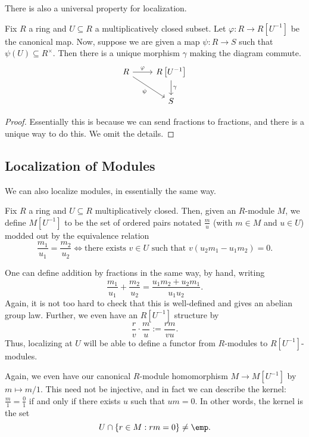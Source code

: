 There is also a universal property for localization.
\begin{proposition}
	Fix $R$ a ring and $U\subseteq R$ a multiplicatively closed subset. Let $\varphi:R\to R\left[U^{-1}\right]$ be the canonical map. Now, suppose we are given a map $\psi:R\to S$ such that $\psi(U)\subseteq R^\times$. Then there is a unique morphism $\gamma$ making the diagram commute.
	\[\begin{tikzcd}
		R & {R\left[U^{-1}\right]} \\
		& S
		\arrow["\psi"', from=1-1, to=2-2]
		\arrow["\varphi", from=1-1, to=1-2]
		\arrow["\gamma", from=1-2, to=2-2]
	\end{tikzcd}\]
\end{proposition}
\begin{proof}
	Essentially this is because we can send fractions to fractions, and there is a unique way to do this. We omit the details.
\end{proof}

\subsection{Localization of Modules}
We can also localize modules, in essentially the same way.
\begin{definition}
	Fix $R$ a ring and $U\subseteq R$ multiplicatively closed. Then, given an $R$-module $M$, we define $M\left[U^{-1}\right]$ to be the set of ordered pairs notated $\frac mu$ (with $m\in M$ and $u\in U$) modded out by the equivalence relation
	\[\frac{m_1}{u_1}=\frac{m_2}{u_2}\iff\text{there exists }v\in U\text{ such that }v(u_2m_1-u_1m_2)=0.\]
\end{definition}
One can define addition by fractions in the same way, by hand, writing
\[\frac{m_1}{u_1}+\frac{m_2}{u_2}=\frac{u_1m_2+u_2m_1}{u_1u_2}.\]
Again, it is not too hard to check that this is well-defined and gives an abelian group law. Further, we even have an $R\left[U^{-1}\right]$ structure by
\[\frac rv\cdot\frac mu:=\frac{rm}{vu}.\]
Thus, localizing at $U$ will be able to define a functor from $R$-modules to $R\left[U^{-1}\right]$-modules.
\begin{remark}
	Again, we even have our canonical $R$-module homomorphism $M\to M\left[U^{-1}\right]$ by $m\mapsto m/1$. This need not be injective, and in fact we can describe the kernel: $\frac m1=\frac01$ if and only if there exists $u$ such that $um=0$. In other words, the kernel is the set
	\[U\cap\{r\in M:rm=0\}\ne\emp.\]
\end{remark}

